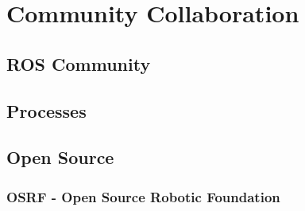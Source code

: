 \chapter{Community Collaboration}

\section{ROS Community}
\section{Processes}
\section{Open Source}
\subsection{OSRF - Open Source Robotic Foundation}
